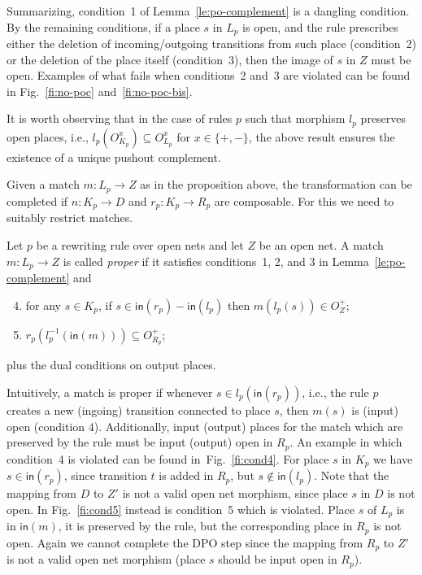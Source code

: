 \documentclass{LMCS}
\newcommand{\inp}[1]{\ensuremath{\mathsf{in}({#1})}}
\begin{document}
\noindent Summarizing, condition~1 of Lemma~\ref{le:po-complement} is
a dangling condition.  By the remaining conditions, if a place $s$ in
$L_p$ is open, and the rule prescribes either the deletion of
incoming/outgoing transitions from such place (condition~2) or the
deletion of the place itself (condition~3), then the image of $s$ in
$Z$ must be open.  Examples of what fails when conditions~2 and~3 are
violated can be found in Fig.~\ref{fi:no-poc} and~\ref{fi:no-poc-bis}.

It is worth observing that in the case of rules $p$ such that morphism
$l_p$ preserves open places, i.e., $l_p(O_{K_p}^x) \subseteq
O_{L_p}^x$ for $x \in \{ +, -\}$, the above result ensures the
existence of a unique pushout complement.

Given a match $m : L_p \to Z$ as in the proposition above, the
transformation can be completed if $n : K_p \to D$ and $r_p : K_p \to
R_p$ are composable. For this we need to suitably restrict matches.



\begin{defi}
  \label{de:proper-match}
  Let $p$ be a rewriting rule over open nets and let $Z$ be an open
  net. A match $m : L_p \to Z$ is called \emph{proper} if it satisfies
  conditions~1, 2, and 3 in Lemma~\ref{le:po-complement} and 

  \begin{enumerate}[(1)]
    \setcounter{enumi}{3}

  \item for any $s \in K_p$,  if $s \in \inp{r_p} - \inp{l_p}$ then $m(l_p(s)) \in O_Z^+$;
    
  \item 
    $r_p(l_p^{-1}(\inp{m})) \subseteq O_{R_p}^+$;
    
  \end{enumerate}
  plus the dual conditions on output places.
\end{defi}
Intuitively, a match is proper if whenever $s \in l_p(\inp{r_p})$,
i.e., the rule $p$ creates a new (ingoing) transition connected to
place $s$, then $m(s)$ is (input) open (condition 4). Additionally,
input (output) places for the match which are preserved by the rule
must be input (output) open in $R_p$.
An example in which condition~4 is violated can be found in~Fig.~\ref{fi:cond4}.
For place $s$ in $K_p$ we have $s \in \inp{r_p}$, since transition $t$ is added in $R_p$, but $s \not\in \inp{l_p}$. Note that the mapping from $D$ to $Z'$ is not a valid open net morphism, since place $s$ in $D$ is not open.
In Fig.~\ref{fi:cond5} instead is condition~5 which is violated. Place
$s$ of $L_p$ is in $\inp{m}$, it is preserved by the rule, but the
corresponding place in $R_p$ is not open. Again we cannot complete the
DPO step since the mapping from $R_p$ to $Z'$ is not a valid open net
morphism (place $s$ should be input open in $R_p$).
\end{document}

